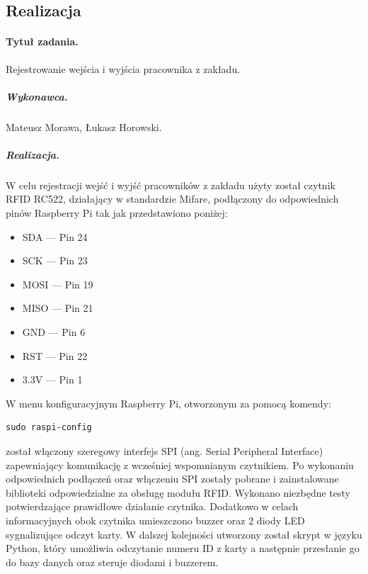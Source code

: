 \documentclass[a4paper]{article}
\begin{document}
\subsection{Realizacja}

\paragraph{Tytuł zadania.} Rejestrowanie wejścia i wyjścia pracownika z zakładu.
\subparagraph{Wykonawca.} Mateusz Morawa, Łukasz Horowski.
\subparagraph{Realizacja.} W celu rejestracji wejść i wyjść pracowników z zakładu użyty został czytnik RFID RC522, działający w standardzie Mifare, podłączony do odpowiednich pinów Raspberry Pi tak jak przedstawiono poniżej:
\begin{itemize}
 \item  SDA   --- Pin 24
 \item  SCK   --- Pin 23
 \item  MOSI  --- Pin 19
 \item  MISO  --- Pin 21
 \item  GND   --- Pin 6
 \item  RST   --- Pin 22
 \item  3.3V  --- Pin 1
\end{itemize}
W  menu konfiguracyjnym Raspberry Pi, otworzonym za pomocą komendy:
\begin{verbatim}
sudo raspi-config
\end{verbatim}
został włączony szeregowy interfejs SPI (ang. Serial Peripheral Interface) zapewniający komunikację z wcześniej wspomnianym czytnikiem. Po wykonaniu odpowiednich podłączeń oraz włączeniu SPI zostały pobrane i zainstalowane biblioteki odpowiedzialne za obsługę modułu RFID. Wykonano niezbędne testy potwierdzające prawidłowe działanie czytnika. Dodatkowo w celach informacyjnych obok czytnika umieszczono buzzer oraz 2 diody LED sygnalizujące odczyt karty. W dalszej kolejności utworzony został skrypt w języku Python, który umożliwia  odczytanie numeru ID z karty a następnie przesłanie go do bazy danych oraz steruje diodami i buzzerem. 
\end{document}
